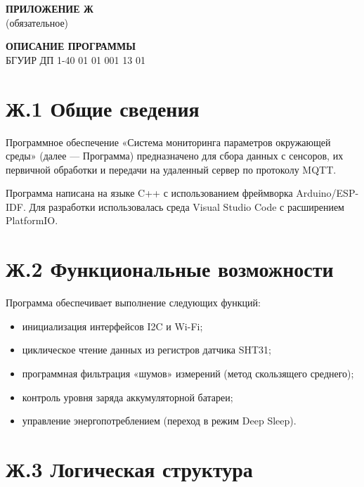 \newpage
\begin{flushright}
    {\bfseries ПРИЛОЖЕНИЕ Ж} \\
    (обязательное)
\end{flushright}

\begin{center}
    {\bfseries ОПИСАНИЕ ПРОГРАММЫ} \\
    \vspace{0.2cm}
    БГУИР ДП 1-40 01 01 001 13 01
\end{center}


\section*{Ж.1 Общие сведения}

Программное обеспечение «Система мониторинга параметров окружающей среды» (далее — Программа) предназначено для сбора данных с сенсоров, их первичной обработки и передачи на удаленный сервер по протоколу MQTT.

Программа написана на языке C++ с использованием фреймворка Arduino/ESP-IDF. Для разработки использовалась среда Visual Studio Code с расширением PlatformIO.

\section*{Ж.2 Функциональные возможности}

Программа обеспечивает выполнение следующих функций:
\begin{itemize}
    \item инициализация интерфейсов I2C и Wi-Fi;
    \item циклическое чтение данных из регистров датчика SHT31;
    \item программная фильтрация «шумов» измерений (метод скользящего среднего);
    \item контроль уровня заряда аккумуляторной батареи;
    \item управление энергопотреблением (переход в режим Deep Sleep).
\end{itemize}

\section*{Ж.3 Логическая структура}


